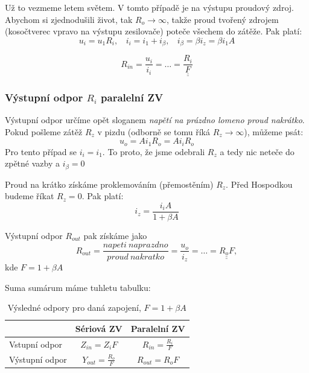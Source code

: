 \documentclass[a4paper,12pt]{article}   %
\begin{document}
Už to vezmeme letem světem. V tomto případě je na výstupu proudový zdroj. Abychom si zjednodušili život, tak $R_o \rightarrow \infty$, takže proud tvořený zdrojem (kosočtverec vpravo na výstupu zesilovače) poteče všechem do zátěže. Pak platí: 
\begin{equation}
    u_i = u_\text{1} R_i,~~~~i_i=i_\text{1} + i_\beta,~~~~ i_\beta = \beta i_z = \beta i_1 A
\end{equation}

\begin{equation}
    R_{in} = \frac{u_i}{i_i} = \dots = \underline{\underline{\frac{R_i}{F}}}
\end{equation}

\subsubsection*{Výstupní odpor $R_i$ paralelní ZV}
Výstupní odpor určíme opět sloganem \textit{napětí na prázdno lomeno proud nakrátko}.
Pokud pošleme zátěž $R_z$ v pizdu (odborně se tomu říká $R_z \rightarrow \infty$), můžeme psát:
\begin{equation*}
    u_o = Ai_\text{1}R_o = Ai_iR_o
\end{equation*}
Pro tento případ se $i_i = i_\text{1}$. To proto, že jsme odebrali $R_z$ a tedy nic neteče do zpětné vazby a $i_\beta = 0$

Proud na krátko získáme proklemováním (přemostěním) $R_z$. Před Hospodkou budeme říkat $R_z = 0$. Pak platí:
\begin{equation*}
    i_z = \frac{i_i A}{1+\beta A}
\end{equation*}

Výstupní odpor $R_{out}$ pak získáme jako
\begin{equation}
    R_{out} = \frac{napeti~naprazdno}{proud~nakratko} = \frac{u_o}{i_z} = \dots = \underline{\underline{R_o F}},
\end{equation}
kde $F=1+\beta A$

Suma sumárum máme tuhletu tabulku:
\begin{table}[h!]
    \centering
    \begin{tabular}{|l|c|c|}
        \hline
        & Sériová ZV & Paralelní ZV\\\hline\hline
        \rule{0pt}{2.5ex}Vstupní odpor & $Z_{in} = Z_i F$ & $R_{in} = \frac{R_i}{F}$\\[.7ex]\hline
        \rule{0pt}{2.5ex}Výstupní odpor & $Y_{out} = \frac{R_o}{F}$ & $R_{out} = R_o F$\\[.7ex]\hline
    \end{tabular}        
    \caption{Výsledné odpory pro daná zapojení, $F=1+\beta A$}
\end{table}%
\end{document}
